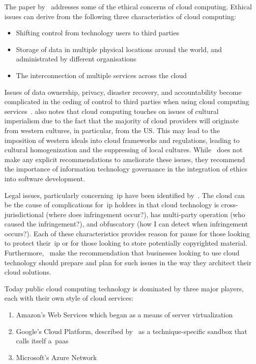 The paper by~\citet{timmermans2010ethics} addresses some of the ethical concerns of cloud computing.
Ethical issues can derive from the following three characteristics of cloud computing:

\begin{itemize}
    \item Shifting control from technology users to third parties
    \item Storage of data in multiple physical locations around the world, and administrated by different organisations
    \item The interconnection of multiple services across the cloud
\end{itemize}

Issues of data ownership, privacy, disaster recovery,
and accountability become complicated in the ceding of control to third parties when using cloud computing services~\citep{timmermans2010ethics}.
\citet{ess_2008} also notes that cloud computing touches on issues of cultural imperialism due to the fact
that the majority of cloud providers will originate from western cultures, in particular, from the US\@.
This may lead to the imposition of western ideals into cloud frameworks and regulations,
leading to cultural homogenization and the suppressing of local cultures.
While~\citet{timmermans2010ethics} does not make any explicit recommendations to ameliorate these issues,
they recommend the importance of information technology governance in the integration of ethics into software development.

Legal issues, particularly concerning~\gls{ip} have been identified by~\citet{roszell_baker_2020}.
The cloud can be the cause of complications for~\gls{ip} holders in that cloud technology is cross-jurisdictional
(where does infringement occur?),
has multi-party operation (who caused the infringement?), and obfuscatory (how I can detect when infringement occurs?).
Each of these characteristics provides reason for pause for those
looking to protect their~\gls{ip} or for those looking to store potentially copyrighted material.
Furthermore,~\citet{roszell_baker_2020} make the recommendation
that businesses looking to use cloud technology should prepare and plan for such issues in the way
they architect their cloud solutions.

Today public cloud computing technology is dominated by three major players, each with their own style of cloud services:

\begin{enumerate}
    \item Amazon's Web Services which began as a means of server virtualization~\citep{awsintro}
    \item Google's Cloud Platform, described by~\citet{cc_overview} as a technique-specific sandbox that calls itself a~\gls{paas}~\citep{googlecloudintro}
    \item Microsoft's Azure Network~\citep{azurefundamentals}
\end{enumerate}

